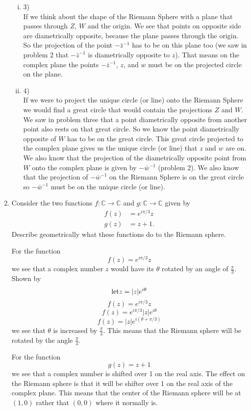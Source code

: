 \documentclass[11pt]{article}
\newcommand{\CC}{\mathbb{C}}
\begin{document}
\begin{enumerate}
\begin{enumerate}[(i)]
\item 3)\\
If we think about the shape of the Riemann Sphere with a plane that passes through $Z$, $W$ and the origin. We see that points on opposite side are diametrically opposite, because the plane passes through the origin. So the projection of the point $-\bar{z}^{-1}$ has to be on this plane too (we saw in problem 2 that $-\bar{z}^{-1}$ is diametrically opposite to $z$). That means on the complex plane the points $-\bar{z}^{-1}$, $z$, and $w$ must be on the projected circle on the plane.
\item 4)\\
If we were to project the unique circle (or line) onto the Riemann Sphere we would find a great circle that would contain the projections $Z$ and $W$. We saw in problem three that a point diametrically opposite from another point also rests on that great circle. So we know the point diametrically opposite of $W$ has to be on the great circle. This great circle projected to the complex plane gives us the unique circle (or line) that $z$ and $w$ are on. We also know that the projection of the diametrically opposite point from $W$ onto the complex plane is given by $-\bar{w}^{-1}$ (problem 2). We also know that the projection of $-\bar{w}^{-1}$ on the Riemann Sphere is on the great circle so $-\bar{w}^{-1}$ must be on the unique circle (or line).
\end{enumerate}

\item Consider the two functions $f:\CC\rightarrow \CC$ and $g:\CC\rightarrow \CC$ given by
\begin{align*} 
f(z) &=e^{i\pi/3}z\\
g(z) & = z + 1. 
\end{align*}
Describe geometrically what these functions do to the Riemann sphere.

For the function
$$f(z) =e^{i\pi/3}z$$
we see that a complex number $z$ would have its $\theta$ rotated by an angle of $\frac{\pi}{3}$. Shown by
$$\textnormal{let} z = |z|e^{i\theta}$$
$$f(z) =e^{i\pi/3}z$$
$$f(z) =e^{i\pi/3}|z|e^{i\theta}$$
$$f(z) =|z|e^{i(\theta + \pi/3)}$$
we see that $\theta$ is increased by $\frac{\pi}{3}$. This means that the Riemann sphere will be rotated by the angle $\frac{\pi}{3}$.


For the function
$$g(z)  = z + 1$$
we see that a complex number is shifted over 1 on the real axis. The effect on the Riemann sphere is that it will be shifter over 1 on the real axis of the complex plane. This means that the center of the Riemann sphere will be at $(1,0)$ rather that $(0,0)$ where it normally is.
\end{enumerate}
\end{document}

